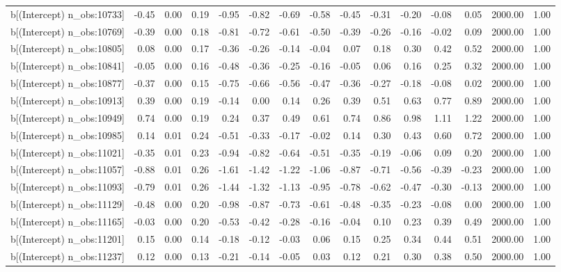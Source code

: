 \begin{table}[ht]
\begin{tabular}{rrrrrrrrrrrrrrr}
  b[(Intercept) n\_obs:10733] & -0.45 & 0.00 & 0.19 & -0.95 & -0.82 & -0.69 & -0.58 & -0.45 & -0.31 & -0.20 & -0.08 & 0.05 & 2000.00 & 1.00 \\ 
  b[(Intercept) n\_obs:10769] & -0.39 & 0.00 & 0.18 & -0.81 & -0.72 & -0.61 & -0.50 & -0.39 & -0.26 & -0.16 & -0.02 & 0.09 & 2000.00 & 1.00 \\ 
  b[(Intercept) n\_obs:10805] & 0.08 & 0.00 & 0.17 & -0.36 & -0.26 & -0.14 & -0.04 & 0.07 & 0.18 & 0.30 & 0.42 & 0.52 & 2000.00 & 1.00 \\ 
  b[(Intercept) n\_obs:10841] & -0.05 & 0.00 & 0.16 & -0.48 & -0.36 & -0.25 & -0.16 & -0.05 & 0.06 & 0.16 & 0.25 & 0.32 & 2000.00 & 1.00 \\ 
  b[(Intercept) n\_obs:10877] & -0.37 & 0.00 & 0.15 & -0.75 & -0.66 & -0.56 & -0.47 & -0.36 & -0.27 & -0.18 & -0.08 & 0.02 & 2000.00 & 1.00 \\ 
  b[(Intercept) n\_obs:10913] & 0.39 & 0.00 & 0.19 & -0.14 & 0.00 & 0.14 & 0.26 & 0.39 & 0.51 & 0.63 & 0.77 & 0.89 & 2000.00 & 1.00 \\ 
  b[(Intercept) n\_obs:10949] & 0.74 & 0.00 & 0.19 & 0.24 & 0.37 & 0.49 & 0.61 & 0.74 & 0.86 & 0.98 & 1.11 & 1.22 & 2000.00 & 1.00 \\ 
  b[(Intercept) n\_obs:10985] & 0.14 & 0.01 & 0.24 & -0.51 & -0.33 & -0.17 & -0.02 & 0.14 & 0.30 & 0.43 & 0.60 & 0.72 & 2000.00 & 1.00 \\ 
  b[(Intercept) n\_obs:11021] & -0.35 & 0.01 & 0.23 & -0.94 & -0.82 & -0.64 & -0.51 & -0.35 & -0.19 & -0.06 & 0.09 & 0.20 & 2000.00 & 1.00 \\ 
  b[(Intercept) n\_obs:11057] & -0.88 & 0.01 & 0.26 & -1.61 & -1.42 & -1.22 & -1.06 & -0.87 & -0.71 & -0.56 & -0.39 & -0.23 & 2000.00 & 1.00 \\ 
  b[(Intercept) n\_obs:11093] & -0.79 & 0.01 & 0.26 & -1.44 & -1.32 & -1.13 & -0.95 & -0.78 & -0.62 & -0.47 & -0.30 & -0.13 & 2000.00 & 1.00 \\ 
  b[(Intercept) n\_obs:11129] & -0.48 & 0.00 & 0.20 & -0.98 & -0.87 & -0.73 & -0.61 & -0.48 & -0.35 & -0.23 & -0.08 & 0.00 & 2000.00 & 1.00 \\ 
  b[(Intercept) n\_obs:11165] & -0.03 & 0.00 & 0.20 & -0.53 & -0.42 & -0.28 & -0.16 & -0.04 & 0.10 & 0.23 & 0.39 & 0.49 & 2000.00 & 1.00 \\ 
  b[(Intercept) n\_obs:11201] & 0.15 & 0.00 & 0.14 & -0.18 & -0.12 & -0.03 & 0.06 & 0.15 & 0.25 & 0.34 & 0.44 & 0.51 & 2000.00 & 1.00 \\ 
  b[(Intercept) n\_obs:11237] & 0.12 & 0.00 & 0.13 & -0.21 & -0.14 & -0.05 & 0.03 & 0.12 & 0.21 & 0.30 & 0.38 & 0.50 & 2000.00 & 1.00 \\ 

\end{tabular}
\end{table}
